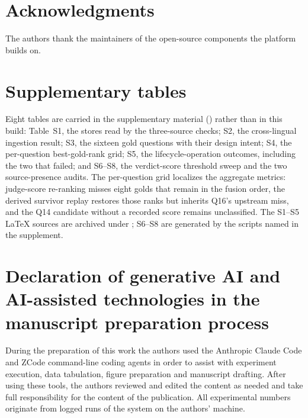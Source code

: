 \section*{Acknowledgments}
The authors thank the maintainers of the open-source components the platform
builds on. %

\appendix
\setcounter{table}{0}
\section{Supplementary tables}
\label{app:perq}

Eight tables are carried in the supplementary material
() rather than in
this build: Table~S1, the stores read by the three-source checks; S2, the
cross-lingual ingestion result; S3, the sixteen gold questions with their
design intent; S4, the per-question best-gold-rank grid; S5, the
lifecycle-operation outcomes, including the two that failed; and S6--S8, the
verdict-score threshold sweep and the two source-presence audits.
The per-question grid localizes the aggregate metrics: judge-score re-ranking
misses eight golds that remain in the fusion order, the derived survivor
replay restores those ranks but inherits Q16's upstream miss, and the Q14
candidate without a recorded score remains unclassified. The S1--S5 LaTeX
sources are archived under
; S6--S8 are generated by
the scripts named in the supplement.

\section*{Declaration of generative AI and AI-assisted technologies in the manuscript preparation process}
During the preparation of this work the authors used the Anthropic Claude
Code and ZCode command-line coding agents in order to assist with experiment
execution, data tabulation, figure preparation and manuscript drafting. After
using these tools, the authors reviewed and edited the content as needed and
take full responsibility for the content of the publication. All experimental
numbers originate from logged runs of the system on the authors'
machine.
